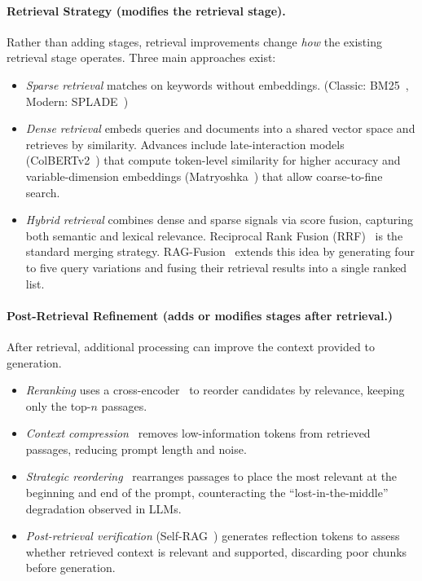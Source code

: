 \paragraph{Retrieval Strategy (modifies the retrieval stage).}
Rather than adding stages, retrieval improvements change \emph{how} the existing retrieval stage 
operates. Three main approaches exist:
\begin{itemize}
    \item \emph{Sparse retrieval} matches on keywords without embeddings. 
    (Classic: BM25~\cite{bm252009}, Modern: SPLADE~\cite{splade2021})
    \item \emph{Dense retrieval} embeds queries and documents into a shared 
    vector space and retrieves by similarity. Advances include late-interaction 
    models (ColBERTv2~\cite{colbertv2}) that compute token-level similarity 
    for higher accuracy and variable-dimension embeddings 
    (Matryoshka~\cite{matryoshka2022}) that allow coarse-to-fine search.
    \item \emph{Hybrid retrieval} combines dense and sparse signals 
    via score fusion, capturing both semantic and lexical relevance. 
    Reciprocal Rank Fusion (RRF)~\cite{rrf2009} is the standard 
    merging strategy. RAG-Fusion~\cite{ragfusion2023} extends this 
    idea by generating four to five query variations and fusing their 
    retrieval results into a single ranked list.
\end{itemize}

\paragraph{Post-Retrieval Refinement (adds or modifies stages after retrieval.)}
After retrieval, additional processing can improve the context provided to generation. 
\begin{itemize}
    \item \emph{Reranking} uses a cross-encoder~\cite{nogueira2019} to reorder 
    candidates by relevance, keeping only the top-$n$ passages.
    \item \emph{Context compression}~\cite{llmlingua2023} removes low-information 
    tokens from retrieved passages, reducing prompt length and noise.
    \item \emph{Strategic reordering}~\cite{lostmiddle2023} rearranges 
    passages to place the most relevant at the beginning and end of the 
    prompt, counteracting the ``lost-in-the-middle'' degradation observed in LLMs.
    \item \emph{Post-retrieval verification} (Self-RAG~\cite{selfrag2024}) 
    generates reflection tokens to assess whether retrieved context is relevant 
    and supported, discarding poor chunks before generation. 
\end{itemize}   

